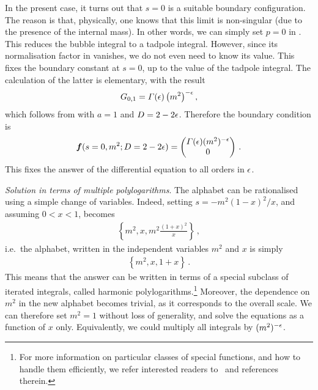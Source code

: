 In the present case, it turns out that $s=0$ is a suitable boundary configuration. The reason is that, physically, one knows that this limit is non-singular (due to the presence of the internal mass). In other words, we can simply set $p=0$ in . This reduces the bubble integral to a tadpole integral. 
However, since its normalisation factor in  vanishes, we do not even need to know its value. 
This fixes the boundary constant at $s=0$, up to the value of the tadpole integral. 
The calculation of the latter is elementary, with the result 
\begin{align}
G_{0,1}= \Gamma(\eps) \, \bigl(m^2\bigr)^{-\eps} \,,
\end{align}
which follows from  with $a=1$ and $D=2 -2 \epsilon$.
Therefore the boundary condition is
\begin{align}\label{boundarybubble1}
\vec{f}(s=0,m^2;D=2-2\eps) = 
 \begin{pmatrix}
\Gamma(\eps) (m^2)^{-\eps} \\
0
\end{pmatrix}\,.
\end{align}
This fixes the answer of the differential equation to all orders in $\epsilon$.



\smallskip

{\it Solution in terms of multiple polylogarithms}.
The alphabet  can be rationalised using a simple change of variables.
Indeed, setting $s = -m^2 (1-x)^2/x$, and assuming $0<x<1$,  becomes 
\begin{align}\label{eq:alphabetbubble2}
    \left\{ m^2, x , m^2 \frac{(1+x)^2}{x}  \right\} \,,
\end{align}
i.e.\ the alphabet, written in the independent variables $m^2$ and $x$ is simply
\begin{align}
    \left\{ m^2, x, 1+x \right\} \,.
\end{align}
This means that the answer can be written in terms of a special subclass of iterated integrals, called harmonic polylogarithms.\footnote{For more information on particular classes of special functions, and how to handle them efficiently, we refer interested readers to~\cite{ch4Duhr:2019wtr} and references therein.}
Moreover, the dependence on $m^2$ in the new alphabet becomes trivial, as it corresponds to the overall scale. We can therefore set $m^2=1$ without loss of generality, and solve the equations as a function of $x$ only. Equivalently, we could multiply all integrals by $(m^2)^{-\epsilon}$.

